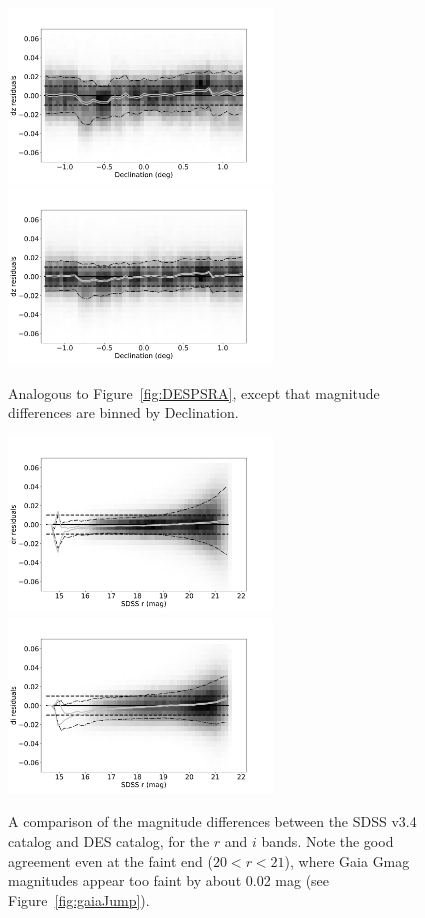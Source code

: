 \begin{figure}[th!]
    \centering\includegraphics[width=7cm]{figures/colorResidDES2bright_dz_Dec_Hess.png}
    \centering\includegraphics[width=7cm]{figures/colorResidPSbright_dz_Dec_Hess.png}
\caption{Analogous to Figure~\ref{fig:DESPSRA}, except that magnitude differences
are binned by Declination.}
\label{fig:DESPSDec}
\end{figure}

\begin{figure}[th!]
    \centering\includegraphics[width=7cm]{figures/colorResidDES2_dr_rmag_Hess.png}
    \centering\includegraphics[width=7cm]{figures/colorResidDES2_di_rmag_Hess.png} 
\caption{A comparison of the magnitude differences between the SDSS v3.4 catalog
and DES catalog, for the $r$ and $i$ bands. Note the good agreement even at the
faint end ($20<r<21$), where Gaia Gmag magnitudes appear too faint by about
0.02 mag (see Figure~\ref{fig:gaiaJump}).} 
\label{fig:drVSr}
\end{figure}




